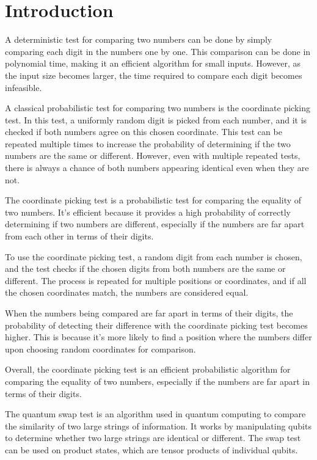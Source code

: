 \chapter{Introduction}


A deterministic test for comparing two numbers can be done by simply comparing each digit in the numbers one by one. This comparison can be done in polynomial time, making it an efficient algorithm for small inputs. However, as the input size becomes larger, the time required to compare each digit becomes infeasible.

A classical probabilistic test for comparing two numbers is the coordinate picking test. In this test, a uniformly random digit is picked from each number, and it is checked if both numbers agree on this chosen coordinate. This test can be repeated multiple times to increase the probability of determining if the two numbers are the same or different. However, even with multiple repeated tests, there is always a chance of both numbers appearing identical even when they are not.



The coordinate picking test is a probabilistic test for comparing the equality of two numbers. It's efficient because it provides a high probability of correctly determining if two numbers are different, especially if the numbers are far apart from each other in terms of their digits.

To use the coordinate picking test, a random digit from each number is chosen, and the test checks if the chosen digits from both numbers are the same or different. The process is repeated for multiple positions or coordinates, and if all the chosen coordinates match, the numbers are considered equal.

When the numbers being compared are far apart in terms of their digits, the probability of detecting their difference with the coordinate picking test becomes higher. This is because it's more likely to find a position where the numbers differ upon choosing random coordinates for comparison.

Overall, the coordinate picking test is an efficient probabilistic algorithm for comparing the equality of two numbers, especially if the numbers are far apart in terms of their digits.



The quantum swap test is an algorithm used in quantum computing to compare the similarity of two large strings of information. It works by manipulating qubits to determine whether two large strings are identical or different. The swap test can be used on product states, which are tensor products of individual qubits. 


